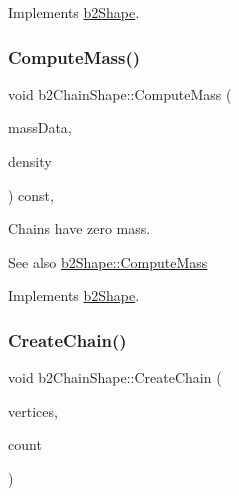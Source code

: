 Implements \mbox{\hyperlink{classb2_shape_a88e9807fab0c8ca9a98d8926e50a1411}{b2\+Shape}}.

\mbox{\label{classb2_chain_shape_aad3671d6eab61f6b26e2f1b6ac50bb98}} 
\subsubsection{\texorpdfstring{ComputeMass()}{ComputeMass()}}
{\footnotesize\ttfamily void b2\+Chain\+Shape\+::\+Compute\+Mass (\begin{DoxyParamCaption}\item[{\mbox{\hyperlink{structb2_mass_data}{b2\+Mass\+Data}} $\ast$}]{mass\+Data,  }\item[{\mbox{\hyperlink{b2_settings_8h_aacdc525d6f7bddb3ae95d5c311bd06a1}{float32}}}]{density }\end{DoxyParamCaption}) const\hspace{0.3cm}{\ttfamily [override]}, {\ttfamily [virtual]}}

Chains have zero mass. \begin{DoxySeeAlso}{See also}
\mbox{\hyperlink{classb2_shape_a61b365526241b47f124789b0309cac69}{b2\+Shape\+::\+Compute\+Mass}} 
\end{DoxySeeAlso}


Implements \mbox{\hyperlink{classb2_shape_a61b365526241b47f124789b0309cac69}{b2\+Shape}}.

\mbox{\label{classb2_chain_shape_aa0977339b743c05f2179939ccc38e7e0}} 
\subsubsection{\texorpdfstring{CreateChain()}{CreateChain()}}
{\footnotesize\ttfamily void b2\+Chain\+Shape\+::\+Create\+Chain (\begin{DoxyParamCaption}\item[{const \mbox{\hyperlink{structb2_vec2}{b2\+Vec2}} $\ast$}]{vertices,  }\item[{\mbox{\hyperlink{b2_settings_8h_a43d43196463bde49cb067f5c20ab8481}{int32}}}]{count }\end{DoxyParamCaption})}

